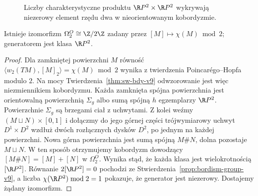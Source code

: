 \begin{figure}[!htbp]
\centering
{}
\caption{Liczby charakterystyczne produktu
$\R P^2\times\R P^2$ wykrywają niezerowy element
rzędu dwa w nieorientowanym kobordyzmie.}
\label{fig:bordism-rp2-product}
\end{figure}

\begin{twierdzenie}
\label{thm:omega2-v9}
Istnieje izomorfizm
$\Omega_2^O\cong\Z/2\Z$ zadany przez
$[M]\mapsto\chi(M)\bmod2$; generatorem jest
klasa $\R P^2$.
\end{twierdzenie}
\begin{proof}
Dla zamkniętej powierzchni $M$ równość
$\langle w_2(TM),[M]_2\rangle=\chi(M)\bmod2$
wynika z twierdzenia Poincarégo--Hopfa modulo $2$.
Na mocy Twierdzenia~\ref{thm:sw-bdy-v9} odwzorowanie
jest więc niezmiennikiem kobordyzmu.
Każda zamknięta spójna powierzchnia jest orientowalną
powierzchnią $\Sigma_g$ albo sumą spójną $h$ egzemplarzy
$\R P^2$. Powierzchnie $\Sigma_g$ są brzegami ciał
z uchwytami. Z kolei weźmy
$(M\sqcup N)\times[0,1]$ i dołączmy do jego górnej
części trójwymiarowy uchwyt $D^1\times D^2$
wzdłuż dwóch rozłącznych dysków $D^2$,
po jednym na każdej powierzchni. Nowa górna
powierzchnia jest sumą spójną $M\#N$,
dolna pozostaje $M\sqcup N$. W ten sposób
otrzymujemy kobordyzm dowodzący
$[M\#N]=[M]+[N]$ w $\Omega_2^O$.
Wynika stąd, że każda klasa jest wielokrotnością
$[\R P^2]$. Równanie $2[\R P^2]=0$ pochodzi
ze Stwierdzenia~\ref{prop:bordism-group-v9}, a liczba
$\chi(\R P^2)\bmod2=1$ pokazuje, że generator
jest niezerowy. Dostajemy żądany izomorfizm.
\end{proof}


